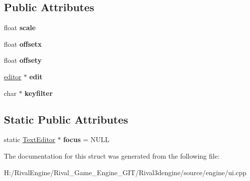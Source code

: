 \subsection*{Public Attributes}
\begin{DoxyCompactItemize}
\item 
\mbox{\label{struct_u_i_1_1_text_editor_a1929d731b31619a7f0a878f8a34f6fab}} 
float {\bfseries scale}
\item 
\mbox{\label{struct_u_i_1_1_text_editor_aae5259f342a52e380ecbada22caadd06}} 
float {\bfseries offsetx}
\item 
\mbox{\label{struct_u_i_1_1_text_editor_ae3169db4699049c43782719ee7570f0d}} 
float {\bfseries offsety}
\item 
\mbox{\label{struct_u_i_1_1_text_editor_a15361aae39aa663a1f2f5e6367574c69}} 
\hyperlink{structeditor}{editor} $\ast$ {\bfseries edit}
\item 
\mbox{\label{struct_u_i_1_1_text_editor_a2cbee99127973c676bbfee69d9bfe1b6}} 
char $\ast$ {\bfseries keyfilter}
\end{DoxyCompactItemize}
\subsection*{Static Public Attributes}
\begin{DoxyCompactItemize}
\item 
\mbox{\label{struct_u_i_1_1_text_editor_a6a82bc50446d694ecd13868f4100465f}} 
static \hyperlink{struct_u_i_1_1_text_editor}{Text\+Editor} $\ast$ {\bfseries focus} = N\+U\+LL
\end{DoxyCompactItemize}


The documentation for this struct was generated from the following file\+:\begin{DoxyCompactItemize}
\item 
H\+:/\+Rival\+Engine/\+Rival\+\_\+\+Game\+\_\+\+Engine\+\_\+\+G\+I\+T/\+Rival3dengine/source/engine/ui.\+cpp\end{DoxyCompactItemize}
